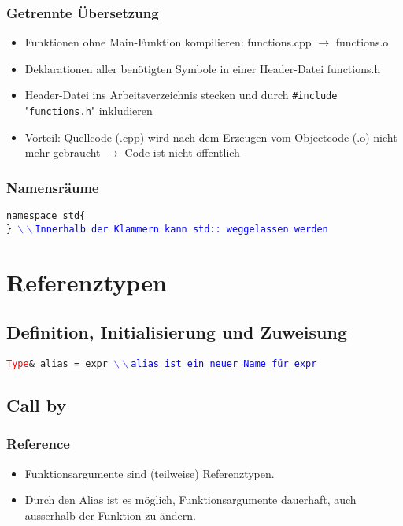 \documentclass[a3paper, 10pt, landscape]{scrartcl}
\newcommand{\code}[1]{\texttt{#1}}
\begin{document}
\begin{multicols*}{3}
	\subsubsection{Getrennte Übersetzung}
	\vspace{0.1cm}
	\begin{itemize}
		\item Funktionen ohne Main-Funktion kompilieren: functions.cpp $\rightarrow$ functions.o
		\item Deklarationen aller benötigten Symbole in einer Header-Datei functions.h
		\item Header-Datei ins Arbeitsverzeichnis stecken und durch \code{\#include} "\code{functions.h}" \space inkludieren
		\item Vorteil: Quellcode (.cpp) wird nach dem Erzeugen vom Objectcode (.o)  nicht mehr gebraucht $\rightarrow$ Code ist nicht öffentlich
	\end{itemize}
	
	\subsubsection{Namensräume}
	\code{namespace std\{ \\
	\} \textcolor{blue}{$\backslash \backslash$Innerhalb der Klammern kann std:: weggelassen werden}
	}
	


\section{Referenztypen}

	\subsection{Definition, Initialisierung und Zuweisung}
	\vspace{0.1cm}
	\code{\textcolor{red}{Type}\& alias = expr  \textcolor{blue}{$\backslash \backslash$alias ist ein neuer Name für expr}}
	\vspace{0.1cm}
	\subsection{Call by}
	
	\subsubsection{Reference}
	\vspace{0.1cm}
	\begin{itemize}
		\item Funktionsargumente sind (teilweise) Referenztypen.
		\item Durch den Alias ist es möglich, Funktionsargumente dauerhaft, auch ausserhalb der Funktion zu ändern.
	\end{itemize}
	

\end{multicols*}
\end{document}

